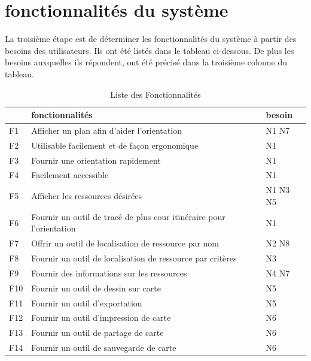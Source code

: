 \documentclass[
    iai, %
    il, %
]{heig-tb}
\begin{document}
\section{fonctionnalités du système}
La troisième étape est de déterminer les fonctionnalités du système à partir des besoins des utilisateurs.
Ils ont été listés dans le tableau ci-dessous.
De plus les besoins auxquelles ils répondent, ont été précisé dans la troisième colonne du tableau.
\begin{table}[H]
    \begin{center}
        \caption{Liste des Fonctionnalités \label{fonctions}}
        \begin{tabular}{l|l|l}
                & fonctionnalités                                                      & besoin   \\ \hline
            F1  & Afficher un plan afin d'aider l'orientation                          & N1 N7    \\
            F2  & Utilisable facilement et de façon ergonomique                        & N1       \\
            F3  & Fournir une orientation rapidement                                   & N1       \\
            F4  & Facilement accessible                                                & N1       \\
            F5  & Afficher les ressources désirées                                     & N1 N3 N5 \\
            F6  & Fournir un outil de tracé de plus cour itinéraire pour l'orientation & N1       \\
            F7  & Offrir un outil de localisation de ressource par nom                 & N2 N8    \\
            F8  & Fournir un outil de localisation de ressource par critères           & N3       \\
            F9  & Fournir des informations sur les ressources                          & N4 N7    \\
            F10 & Fournir un outil de dessin sur carte                                 & N5       \\
            F11 & Fournir un outil d'exportation                                       & N5       \\
            F12 & Fournir un outil d'impression de carte                               & N6       \\
            F13 & Fournir un outil de partage de carte                                 & N6       \\
            F14 & Fournir un outil de sauvegarde de carte                              & N6
        \end{tabular}
    \end{center}
\end{table}
\end{document}
